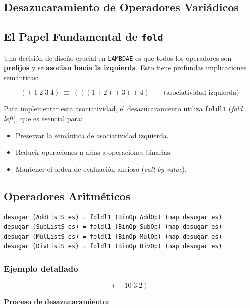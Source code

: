 \documentclass[a4paper,12pt]{article}
\begin{document}
\begin{tcolorbox}[title= Corrección: Desugar modulo A4, breakable]
\section{Desazucaramiento de Operadores Variádicos}

\subsection{El Papel Fundamental de \texttt{fold}}

Una decisión de diseño crucial en \texttt{LAMBDAE} es que todos los operadores son
\textbf{prefijos} y se \textbf{asocian hacia la izquierda}. Esto tiene profundas implicaciones semánticas:

\[
(+\; 1\; 2\; 3\; 4) \;\equiv\; (((1 + 2) + 3) + 4)
\qquad \text{(asociatividad izquierda)}
\]

Para implementar esta asociatividad, el desazucaramiento utiliza \texttt{foldl1}
(\emph{fold left}), que es esencial para:

\begin{itemize}
    \item Preservar la semántica de asociatividad izquierda.
    \item Reducir operaciones n-arias a operaciones binarias.
    \item Mantener el orden de evaluación ansioso (\emph{call-by-value}).
\end{itemize}

\subsection{Operadores Aritméticos}

\begin{verbatim}
desugar (AddListS es) = foldl1 (BinOp AddOp) (map desugar es)
desugar (SubListS es) = foldl1 (BinOp SubOp) (map desugar es)
desugar (MulListS es) = foldl1 (BinOp MulOp) (map desugar es)
desugar (DivListS es) = foldl1 (BinOp DivOp) (map desugar es)
\end{verbatim}

\subsubsection*{Ejemplo detallado}

\[
(-\; 10\; 3\; 2)
\]

\noindent\textbf{Proceso de desazucaramiento:}


\end{tcolorbox}
\end{document}
